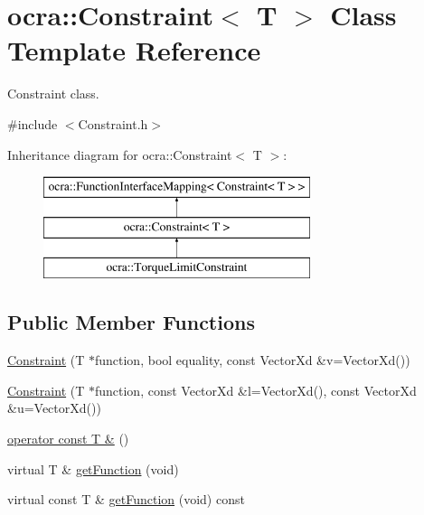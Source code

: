 \hypertarget{classocra_1_1Constraint}{}\section{ocra\+:\+:Constraint$<$ T $>$ Class Template Reference}
\label{classocra_1_1Constraint}


Constraint class.  




{\ttfamily \#include $<$Constraint.\+h$>$}

Inheritance diagram for ocra\+:\+:Constraint$<$ T $>$\+:\begin{figure}[H]
\begin{center}
\leavevmode
\includegraphics[height=3.000000cm]{dc/d5c/classocra_1_1Constraint}
\end{center}
\end{figure}
\subsection*{Public Member Functions}
\begin{DoxyCompactItemize}
\item 
\hyperlink{classocra_1_1Constraint_a73cc6c5b8e5c29ae3c1d8ed997c9e6e5}{Constraint} (T $\ast$function, bool equality, const Vector\+Xd \&v=Vector\+Xd())
\item 
\hyperlink{classocra_1_1Constraint_aca55ef9a5ea48fa91d846c53f4e30ad1}{Constraint} (T $\ast$function, const Vector\+Xd \&l=Vector\+Xd(), const Vector\+Xd \&u=Vector\+Xd())
\item 
\hyperlink{classocra_1_1Constraint_a4a0f49dbc4042347872429298f689091}{operator const T \&} ()
\end{DoxyCompactItemize}
{\bf }\par
\begin{DoxyCompactItemize}
\item 
virtual T \& \hyperlink{classocra_1_1Constraint_a6083fd05133e7aefae68fc84641149c1}{get\+Function} (void)
\item 
virtual const T \& \hyperlink{classocra_1_1Constraint_a2bda1f6319de9c803571a232d790f497}{get\+Function} (void) const
\end{DoxyCompactItemize}



